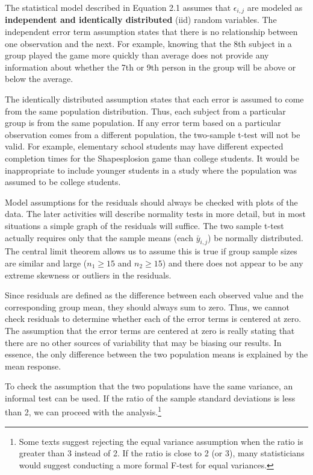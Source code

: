 \documentclass[
]{report}
\begin{document}
The statistical model described in Equation 2.1 assumes that \(\scriptstyle \epsilon_{i, j}\) are modeled as \textbf{independent and identically distributed} (iid) random variables. The independent error term assumption states that there is no relationship between one observation and the next. For example, knowing that the 8th subject in a group played the game more quickly than average does not provide any information about whether the 7th or 9th person in the group will be above or below the average.

The identically distributed assumption states that each error is assumed to come from the same population distribution. Thus, each subject from a particular group is from the same population. If any error term
based on a particular observation comes from a different population, the two-sample t-test will not be valid. For example, elementary school students may have different expected completion times for the Shapesplosion game than college students. It would be inappropriate to include younger students in a study where the population was assumed to be college students.

Model assumptions for the residuals should always be checked with plots of the data. The later activities will describe normality tests in more detail, but in most situations a simple graph of the residuals will
suffice. The two sample t-test actually requires only that the sample means (each \(\scriptstyle \bar{y}_{i,j}\)) be normally distributed. The central limit theorem allows us to assume this is true if group sample sizes are similar and large (\(\scriptstyle n_1 \ge 15\) and \(\scriptstyle n_2 \ge 15\)) and there does not appear to be any extreme skewness or outliers in the residuals.

Since residuals are defined as the difference between each observed value and the corresponding group mean, they should always sum to zero. Thus, we cannot check residuals to determine whether each of the error
terms is centered at zero. The assumption that the error terms are centered at zero is really stating that there are no other sources of variability that may be biasing our results. In essence, the only difference between the two population means is explained by the mean response.

To check the assumption that the two populations have the same variance, an informal test can be used. If the ratio of the sample standard deviations is less than 2, we can proceed with the analysis.\footnote{Some texts suggest rejecting the equal variance assumption when the ratio is greater than 3 instead of 2. If the ratio is close to 2 (or 3), many statisticians would suggest conducting a more formal F-test for equal variances.}
\end{document}
